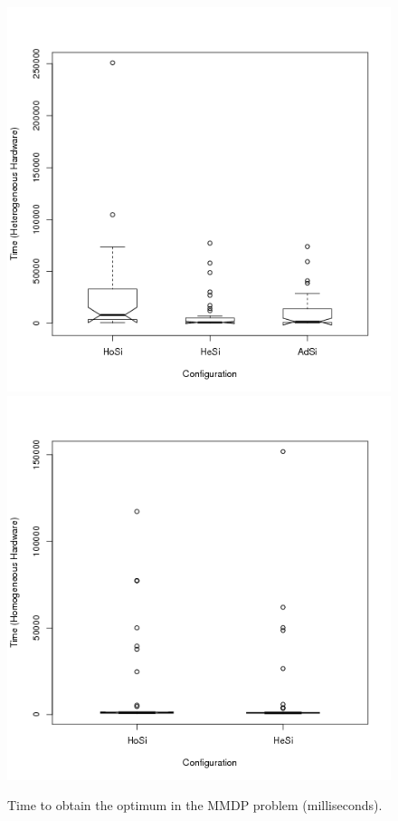 \begin{figure}
\centering

   \includegraphics[scale =0.4] {gfx/adaptiveresults/timeMMDPhetero.png}
   \label{fig:subfig1}
   \includegraphics[scale =0.4] {gfx/adaptiveresults/timeMMDPhomo.png}
   \label{fig:subfig2}
\caption{Time to obtain the optimum in the MMDP problem
  (milliseconds).}

\label{fig:timeMMDP}
\end{figure}

